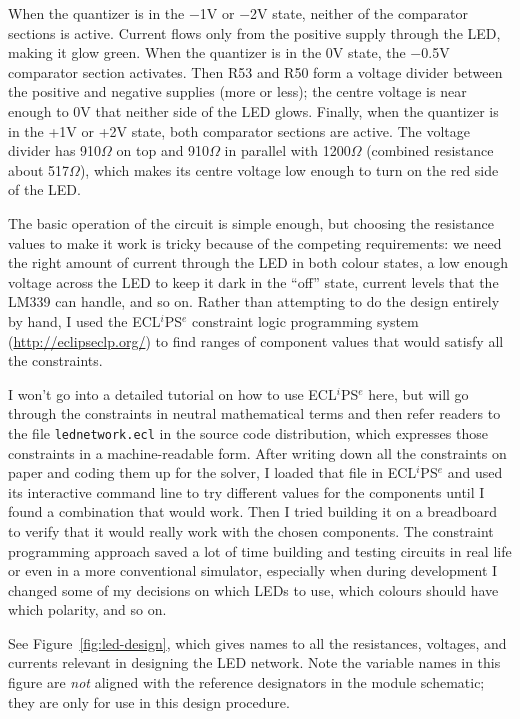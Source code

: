 {\centering\par}

When the quantizer is in the $-$1V or $-$2V state, neither of the comparator
sections is active.  Current flows only from the positive supply through the
LED, making it glow green.  When the quantizer is in the 0V state, the
$-$0.5V comparator section activates.  Then R53 and R50 form a voltage divider
between the positive and negative supplies (more or less); the centre
voltage is near enough to 0V that neither side of the LED glows.  Finally,
when the quantizer is in the +1V or +2V state, both comparator sections are
active.  The voltage divider has 910$\Omega$ on top and 910$\Omega$ in
parallel with 1200$\Omega$ (combined resistance about 517$\Omega$), which
makes its centre voltage low enough to turn on the red side of the LED.

The basic operation of the circuit is simple enough, but choosing the
resistance values to make it work is tricky because of the competing
requirements:  we need the right amount of current through the LED in both
colour states, a low enough voltage across the LED to keep it dark in the
``off'' state, current levels that the LM339 can handle, and so on.  Rather
than attempting to do the design entirely by hand, I used the ECL$^i$PS$^e$
constraint logic programming system (\url{http://eclipseclp.org/}) to find
ranges of component values that would satisfy all the constraints.

I won't go into a detailed tutorial on how to use ECL$^i$PS$^e$ here, but
will go through the constraints in neutral mathematical terms and then refer
readers to the file \texttt{lednetwork.ecl} in the source code distribution,
which expresses those constraints in a machine-readable form.  After writing
down all the constraints on paper and coding them up for the solver, I
loaded that file in ECL$^i$PS$^e$ and used its interactive command line to
try different values for the components until I found a combination that
would work.  Then I tried building it on a breadboard to verify that it
would really work with the chosen components.  The constraint programming
approach saved a lot of time building and testing circuits in real life or
even in a more conventional simulator, especially when during development I
changed some of my decisions on which LEDs to use, which colours should have
which polarity, and so on.

See Figure~\ref{fig:led-design}, which gives names to all the resistances,
voltages, and currents relevant in designing the LED network.  Note the
variable names in this figure are \emph{not} aligned with the reference
designators in the module schematic; they are only for use in this design
procedure.

